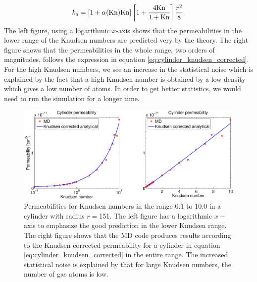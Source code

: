 \begin{align}
	\label{eq:cylinder_knudsen_corrected}
	k_a = [1 + \alpha(\text{Kn})\text{Kn}]\left[1 + {4\text{Kn}\over 1 + \text{Kn}}\right] {r^2\over 8}.
\end{align}
The left figure, using a logarithmic $x$-axis shows that the permeabilities in the lower range of the Knudsen numbers are predicted very by the theory. The right figure shows that the permeabilities in the whole range, two orders of magnitudes, follows the expression in equation \eqref{eq:cylinder_knudsen_corrected}. For the high Knudsen numbers, we see an increase in the statistical noise which is explained by the fact that a high Knudsen number is obtained by a low density which gives a low number of atoms. In order to get better statistics, we would need to run the simulation for a longer time.
\begin{figure}[h]
\begin{center}
\includegraphics[width=1.0\textwidth, trim=3cm 0cm 3cm 0cm, clip]{MD/figures/permeability_cylinder.eps}
\end{center}
\caption{Permeabilities for Knudsen numbers in the range $0.1$ to $10.0$ in a cylinder with radius $r=$\unit{151}{\angstrom}. The left figure has a logarithmic $x-$axis to emphasize the good prediction in the lower Knudsen range. The right figure shows that the MD code produces results according to the Knudsen corrected permeability for a cylinder in equation \eqref{eq:cylinder_knudsen_corrected} in the entire range. The increased statistical noise is explained by that for large Knudsen numbers, the number of gas atoms is low.}
\label{fig:md_permeability}
\end{figure}